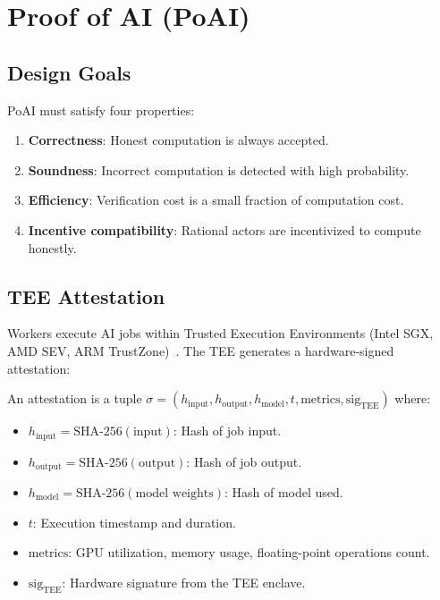 \section{Proof of AI (PoAI)}

\label{sec:poai}

\subsection{Design Goals}

PoAI must satisfy four properties:

\begin{enumerate}[leftmargin=1.4em]
    \item \textbf{Correctness}: Honest computation is always accepted.
    \item \textbf{Soundness}: Incorrect computation is detected with high probability.
    \item \textbf{Efficiency}: Verification cost is a small fraction of computation cost.
    \item \textbf{Incentive compatibility}: Rational actors are incentivized to compute honestly.
\end{enumerate}

\subsection{TEE Attestation}

Workers execute AI jobs within Trusted Execution Environments (Intel SGX, AMD SEV, ARM TrustZone)~\cite{costan2016intel}. The TEE generates a hardware-signed attestation:

\begin{definition}
An attestation is a tuple $\sigma = (h_{\text{input}}, h_{\text{output}}, h_{\text{model}}, t, \text{metrics}, \text{sig}_{\text{TEE}})$ where:
\begin{itemize}[leftmargin=1.1em]
    \item $h_{\text{input}} = \text{SHA-256}(\text{input})$: Hash of job input.
    \item $h_{\text{output}} = \text{SHA-256}(\text{output})$: Hash of job output.
    \item $h_{\text{model}} = \text{SHA-256}(\text{model weights})$: Hash of model used.
    \item $t$: Execution timestamp and duration.
    \item $\text{metrics}$: GPU utilization, memory usage, floating-point operations count.
    \item $\text{sig}_{\text{TEE}}$: Hardware signature from the TEE enclave.
\end{itemize}
\end{definition}

